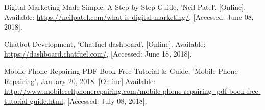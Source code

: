 \documentclass[12pt, a4paper]{report}
\begin{document}
\renewcommand\bibname{References} %






% 
% 
\tableofcontents
\listoffigures
\listoftables



\newpage
{} %








% 
% 
% 
%

%
%

\begin{thebibliography}{999}

  Digital Marketing Made Simple: A Step-by-Step Guide, 'Neil Patel'. [Online].
  Available: \url{https://neilpatel.com/what-is-digital-marketing/}, 
  [Accessed: June 08, 2018].
  
  Chatbot Development, 'Chatfuel dashboard'. [Online].
  Available: \url{https://dashboard.chatfuel.com/}, 
  [Accessed: June 18, 2018].
  
  
	  Mobile Phone Repairing PDF Book Free Tutorial \& Guide, 'Mobile Phone Repairing', January 20,          	  2018. [Online].Available: \url{http://www.mobilecellphonerepairing.com/mobile-phone-repairing-		  pdf-book-free-tutorial-guide.html}, 
  	  [Accessed: July 08, 2018].
  
 
\end{thebibliography}


\end{document}
